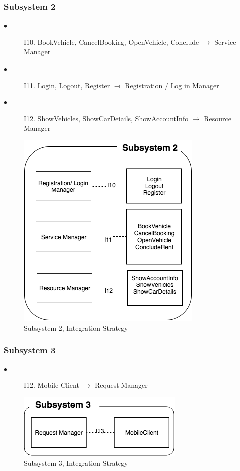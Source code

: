 \documentclass[a4paper,10pt]{article}
\begin{document}
  \subsubsection{Subsystem 2}
\begin{description}
    \item[$\bullet$] I10. BookVehicle, CancelBooking, OpenVehicle, Conclude $\rightarrow$ Service Manager
    \item[$\bullet$] I11. Login, Logout, Register $\rightarrow$ Registration / Log in Manager
    \item[$\bullet$] I12. ShowVehicles, ShowCarDetails, ShowAccountInfo $\rightarrow$ Resource Manager
  \end{description}
  \begin{figure}[!h]
  \centering
    \includegraphics[scale=0.50]{Resources/subsistem2.png}
    \caption{Subsystem 2, Integration Strategy}
  \end{figure}
  \FloatBarrier
 \subsubsection{Subsystem 3}
\begin{description}
    \item[$\bullet$] I12. Mobile Client $\rightarrow$ Request Manager
  \end{description}
  \begin{figure}[!h]
  \centering
    \includegraphics[scale=0.50]{Resources/subsistem3.png}
    \caption{Subsystem 3, Integration Strategy}
  \end{figure}
  \FloatBarrier
\end{document}
